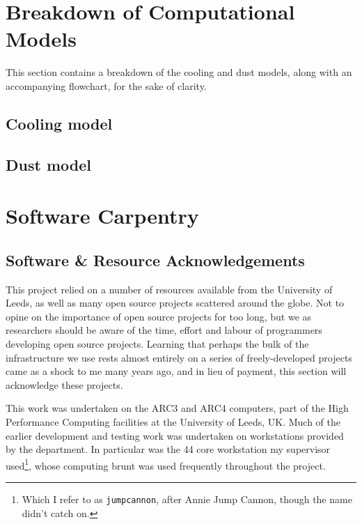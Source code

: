 
\chapter{Breakdown of Computational Models}

This section contains a breakdown of the cooling and dust models, along with an accompanying flowchart, for the sake of clarity.

\section{Cooling model}

\section{Dust model}

\chapter{Software Carpentry}

\section{Software \& Resource Acknowledgements}

This project relied on a number of resources available from the University of Leeds, as well as many open source projects scattered around the globe.
Not to opine on the importance of open source projects for too long, but we as researchers should be aware of the time, effort and labour of programmers developing open source projects.
Learning that perhaps the bulk of the infrastructure we use rests almost entirely on a series of freely-developed projects came as a shock to me many years ago, and in lieu of payment, this section will acknowledge these projects.

This work was undertaken on the ARC3 and ARC4 computers, part of the High Performance Computing facilities at the University of Leeds, UK.
Much of the earlier development and testing work was undertaken on workstations provided by the department.
In particular was the 44 core workstation my supervisor used\footnote{Which I refer to as \texttt{jumpcannon}, after Annie Jump Cannon, though the name didn't catch on.}, whose computing brunt was used frequently throughout the project.

